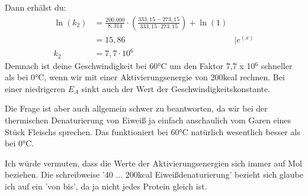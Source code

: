 \documentclass[a4paper,11pt]{article}
\begin{document}
Dann erhälst du:
\begin{align*}
\ln(k_2) &= \frac{200.000}{8,314} \cdot (\frac{333,15-273,15}{333,15 \cdot 273,15}) + \ln(1) \\
 &= 15,86 & | e^{(x)} \\ 
 k_2 &= 7,7 \cdot 10^6 
\end{align*}
Demnach ist deine Geschwindigkeit bei 60°C um den Faktor 7,7 x 10$^6$ schneller als bei 0°C, wenn wir mit einer Aktivierungsenergie von 200kcal rechnen. Bei einer niedrigeren $E_A$ sinkt auch der Wert der Geschwindigkeitskonstante.
\par \vspace*{2cm}
Die Frage ist aber auch allgemein schwer zu beantworten, da wir bei der thermischen Denaturierung von Eiweiß ja einfach anschaulich vom Garen eines Stück Fleischs sprechen. Das funktioniert bei 60°C natürlich wesentlich besser als bei 0°C. \par 
Ich würde vermuten, dass die Werte der Aktivierungsenergien sich immer auf Mol beziehen. Die schreibweise '40 ... 200kcal Eiweißdenaturierung' bezieht sich glaube ich auf ein 'von bis', da ja nicht jedes Protein gleich ist.
\end{document}
